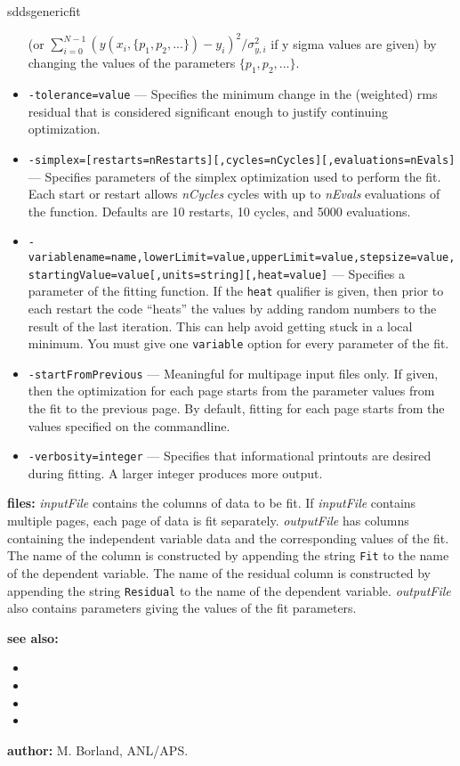 \begin{sddsprog}{sddsgenericfit}
\begin{itemize}
        (or $\sum_{i=0}^{N-1} (y(x_i, \{p_1, p_2, ...\}) - y_i)^2/\sigma_{y,i}^2$ if y sigma values are given)
        by changing the values of the parameters $\{p_1, p_2, ...\}$.
      \item \verb|-tolerance=value| --- Specifies the minimum change in the (weighted) rms residual that is considered
        significant enough to justify continuing optimization.
      \item \verb|-simplex=[restarts=nRestarts][,cycles=nCycles][,evaluations=nEvals]| --- Specifies parameters of the simplex optimization used to perform the fit.
        Each start or restart allows \emph{nCycles} cycles with up to \emph{nEvals} evaluations of the function.
        Defaults are 10 restarts, 10 cycles, and 5000 evaluations.
      \item \verb|-variablename=name,lowerLimit=value,upperLimit=value,stepsize=value,startingValue=value[,units=string][,heat=value]| ---
        Specifies a parameter of the fitting function. If the \verb|heat| qualifier is given, then prior to each restart the code ``heats'' the values by adding random
        numbers to the result of the last iteration. This can help avoid getting stuck
        in a local minimum. You must give one \verb|variable| option for every parameter of the fit.
      \item \verb|-startFromPrevious| --- Meaningful for multipage input files only. If given,
        then the optimization for each page starts from the parameter values from the fit
        to the previous page. By default, fitting for each page starts from the values
        specified on the commandline.
      \item \verb|-verbosity=integer| --- Specifies that informational printouts are desired during fitting. A larger integer produces more output.
    \end{itemize}
  \item \textbf{files:} \emph{inputFile} contains the columns of data to be fit. If \emph{inputFile} contains multiple pages, each page of data is
    fit separately. \emph{outputFile} has columns containing the independent variable data and the corresponding values of the fit.
    The name of the column is constructed by appending the string \verb|Fit| to the name of the dependent variable. The name of the residual
    column is constructed by appending the string \verb|Residual| to the name of the dependent variable. \emph{outputFile} also contains
    parameters giving the values of the fit parameters.
  \item \textbf{see also:}
    \begin{itemize}
      \item {}
      \item {}
      \item {}
      \item {}
    \end{itemize}
  \item \textbf{author:} M. Borland, ANL/APS.
\end{sddsprog}

